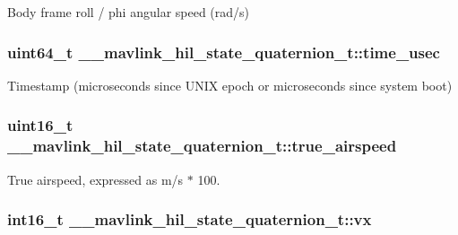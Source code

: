 Body frame roll / phi angular speed (rad/s) 

\hypertarget{struct____mavlink__hil__state__quaternion__t_a15c7dccf96d2c5087b171d388dd775d8}{
\subsubsection[{time\+\_\+usec}]{\setlength{\rightskip}{0pt plus 5cm}uint64\+\_\+t \+\_\+\+\_\+mavlink\+\_\+hil\+\_\+state\+\_\+quaternion\+\_\+t\+::time\+\_\+usec}}\label{struct____mavlink__hil__state__quaternion__t_a15c7dccf96d2c5087b171d388dd775d8}


Timestamp (microseconds since U\+N\+I\+X epoch or microseconds since system boot) 

\hypertarget{struct____mavlink__hil__state__quaternion__t_ac644e31d08eeed05f5f3b7eacdd18f4b}{
\subsubsection[{true\+\_\+airspeed}]{\setlength{\rightskip}{0pt plus 5cm}uint16\+\_\+t \+\_\+\+\_\+mavlink\+\_\+hil\+\_\+state\+\_\+quaternion\+\_\+t\+::true\+\_\+airspeed}}\label{struct____mavlink__hil__state__quaternion__t_ac644e31d08eeed05f5f3b7eacdd18f4b}


True airspeed, expressed as m/s $\ast$ 100. 

\hypertarget{struct____mavlink__hil__state__quaternion__t_a0c33d3ef8decf225d84201d19b5da35f}{
\subsubsection[{vx}]{\setlength{\rightskip}{0pt plus 5cm}int16\+\_\+t \+\_\+\+\_\+mavlink\+\_\+hil\+\_\+state\+\_\+quaternion\+\_\+t\+::vx}}\label{struct____mavlink__hil__state__quaternion__t_a0c33d3ef8decf225d84201d19b5da35f}


